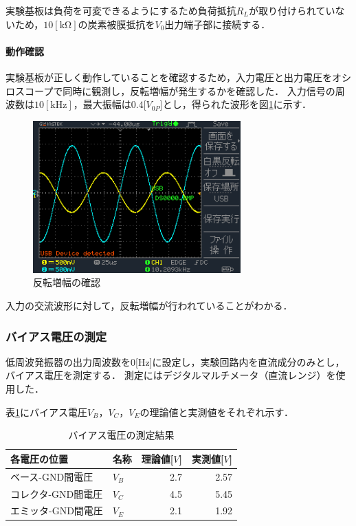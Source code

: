 \documentclass[dvipdfmx,titlepage,a4j]{jsarticle}  %
\numberwithin{equation}{section}
\begin{document}
実験基板は負荷を可変できるようにするため負荷抵抗$R_L$が取り付けられていないため，$10 \mathrm{[k\Omega]}$の炭素被膜抵抗を$V_0$出力端子部に接続する．

\paragraph{動作確認}
実験基板が正しく動作していることを確認するため，入力電圧と出力電圧をオシロスコープで同時に観測し，反転増幅が発生するかを確認した．
入力信号の周波数は$10 \mathrm{[kHz]}$，最大振幅は$0.4$[$V_{0P}$]とし，得られた波形を図\ref{fig:DS0000.BMP}に示す．
\begin{figure}[H]
  \centering
  \includegraphics[width=8cm]{../oscilloscope/DS0000.BMP}
  \caption{反転増幅の確認}
  \label{fig:DS0000.BMP}
\end{figure}
入力の交流波形に対して，反転増幅が行われていることがわかる．

\subsubsection{バイアス電圧の測定}
低周波発振器の出力周波数を0[Hz]に設定し，実験回路内を直流成分のみとし，バイアス電圧を測定する．
測定にはデジタルマルチメータ（直流レンジ）を使用した．

表\ref{tbl:res;bias}にバイアス電圧$V_B$，$V_C$，$V_E$の理論値と実測値をそれぞれ示す．
\begin{table}[H]
  \caption{バイアス電圧の測定結果}
  \begin{center}
    \begin{tabular}{l|l|r|r}
      \hline
      各電圧の位置       & 名称  & \multicolumn{1}{l|}{理論値[$V$]} & \multicolumn{1}{l}{実測値[$V$]} \\ \hline\hline
      ベース-GND間電圧   & $V_B$ & 2.7                              & 2.57                            \\ \hline
      コレクタ-GND間電圧 & $V_C$ & 4.5                              & 5.45                            \\ \hline
      エミッタ-GND間電圧 & $V_E$ & 2.1                              & 1.92                            \\ \hline
    \end{tabular}
  \end{center}
  \label{tbl:res;bias}
\end{table}
\end{document}
